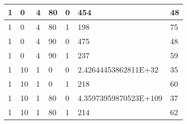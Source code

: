 \documentclass{article}
\theoremstyle{definition}
\begin{document}
\begin{table}[]
\begin{tabular}{|l|l|l|l|l|l|l|}
1                                      & 0                                       & 4                                      & 80                                   & 0                                      & 454                                      & 48                                     \\ \hline
1                                      & 0                                       & 4                                      & 80                                   & 1                                      & 198                                      & 75                                     \\ \hline
1                                      & 0                                       & 4                                      & 90                                   & 0                                      & 475                                      & 48                                     \\ \hline
1                                      & 0                                       & 4                                      & 90                                   & 1                                      & 237                                      & 59                                     \\ \hline
1                                      & 10                                      & 1                                      & 0                                    & 0                                      & 2.42644453862811E+32                     & 35                                     \\ \hline
1                                      & 10                                      & 1                                      & 0                                    & 1                                      & 218                                      & 60                                     \\ \hline
1                                      & 10                                      & 1                                      & 80                                   & 0                                      & 4.35973959870523E+109                    & 37                                     \\ \hline
1                                      & 10                                      & 1                                      & 80                                   & 1                                      & 214                                      & 62                                     \\ \hline

\end{tabular}
\end{table}
\end{document}
